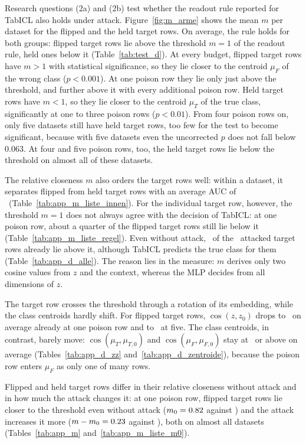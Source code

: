 \documentclass[pdflatex,sn-mathphys-num]{sn-jnl}
\begin{document}
Research questions (2a) and (2b) test whether the readout rule reported for
TabICL also holds under attack. Figure~\ref{fig:m_arme} shows the mean
$m$ per dataset for the flipped and the held target rows. On average, the rule holds for both
groups: flipped target rows lie above the threshold
$m = 1$ of the readout rule, held ones below it
(Table~\ref{tab:test_d}). At every budget, flipped target rows have
$m > 1$ with statistical significance, so they lie closer to the
centroid $\mu_F$ of the wrong class ($p < 0.001$). At one poison row they lie only just above the
threshold, and further above it with every additional poison row. Held target rows have $m < 1$, so they lie closer to the
centroid $\mu_T$ of the true class, significantly at one to three poison
rows ($p < 0.01$). From four poison rows on, only five datasets still
have held target rows, too few for the test to become significant,
because with five datasets even the uncorrected $p$ does not fall below
0.063. At four and five poison rows, too, the held target rows lie
below the threshold on almost all of these datasets.

The relative closeness $m$ also orders the target rows well: within a
dataset, it separates flipped from held target rows with an average AUC
of \zMauc\ (Table~\ref{tab:app_m_liste_innen}). For the individual target
row, however, the threshold $m = 1$ does not always agree with the
decision of TabICL: at one poison row, about a quarter of the flipped
target rows still lie below it (Table~\ref{tab:app_m_liste_regel}). Even
without attack, \zMnullUeberZeilen\ of the \zICLangegriffen\ attacked
target rows already lie above it, although TabICL predicts the true class
for them (Table~\ref{tab:app_d_alle}). The reason lies in the measure:
$m$ derives only two cosine values from $z$ and the context, whereas the
MLP decides from all dimensions of $z$.

The target row crosses the threshold through a rotation of its
embedding, while the class centroids hardly shift. For flipped target
rows, $\cos(z, z_0)$ drops to \zMcosZgekippt\ on average already at one
poison row and to \zMcosZgekipptFuenf\ at five. The class centroids, in
contrast, barely move: $\cos(\mu_T, \mu_{T,0})$ and
$\cos(\mu_F, \mu_{F,0})$ stay at \zMcosMuAlleMin\ or above on average
(Tables~\ref{tab:app_d_zz}
and~\ref{tab:app_d_zentroide}), because the poison row enters $\mu_F$ as
only one of many rows.

Flipped and held target rows differ in their relative closeness without
attack and in how much the attack changes it: at one poison row, flipped
target rows lie closer to the threshold even without attack
($m_0 = 0.82$ against \zMstartGehalten) and the attack
increases it more ($m - m_0 = 0.23$ against \zMschubGehalten), both on almost
all datasets (Tables~\ref{tab:app_m} and~\ref{tab:app_m_liste_m0}).
\end{document}
